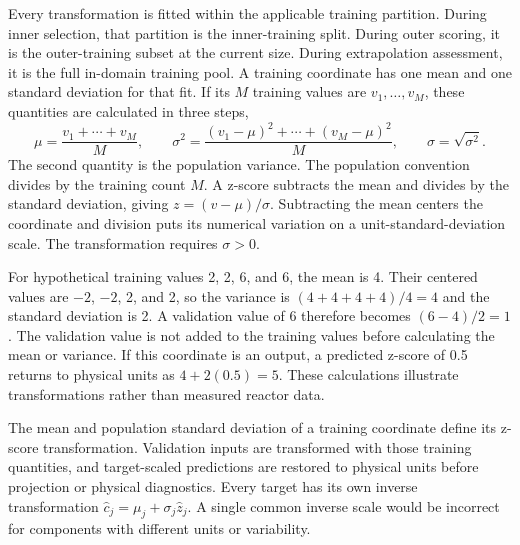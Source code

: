 Every transformation is fitted within the applicable training partition. During inner selection, that partition is the inner-training split. During outer scoring, it is the outer-training subset at the current size. During extrapolation assessment, it is the full in-domain training pool. A training coordinate has one mean and one standard deviation for that fit. If its $M$ training values are $v_1,\ldots,v_M$, these quantities are calculated in three steps,
\[
\mu=\frac{v_1+\cdots+v_M}{M},\qquad
\sigma^2=\frac{(v_1-\mu)^2+\cdots+(v_M-\mu)^2}{M},\qquad
\sigma=\sqrt{\sigma^2}.
\]
The second quantity is the population variance. The population convention divides by the training count $M$. A z-score subtracts the mean and divides by the standard deviation, giving $z=(v-\mu)/\sigma$. Subtracting the mean centers the coordinate and division puts its numerical variation on a unit-standard-deviation scale. The transformation requires $\sigma>0$.

For hypothetical training values 2, 2, 6, and 6, the mean is 4. Their centered values are $-2$, $-2$, 2, and 2, so the variance is $(4+4+4+4)/4=4$ and the standard deviation is 2. A validation value of 6 therefore becomes $(6-4)/2=1$. The validation value is not added to the training values before calculating the mean or variance. If this coordinate is an output, a predicted z-score of 0.5 returns to physical units as $4+2(0.5)=5$. These calculations illustrate transformations rather than measured reactor data.

The mean and population standard deviation of a training coordinate define its z-score transformation. Validation inputs are transformed with those training quantities, and target-scaled predictions are restored to physical units before projection or physical diagnostics. Every target has its own inverse transformation $\widehat c_j=\mu_j+\sigma_j\widehat z_j$. A single common inverse scale would be incorrect for components with different units or variability.


